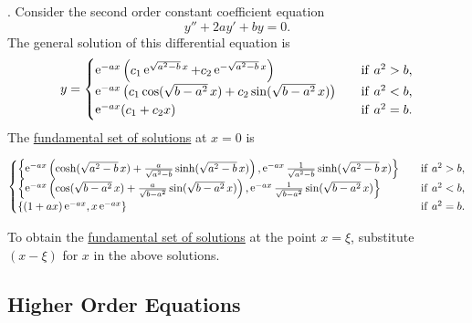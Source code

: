 \begin{Result}
  \label{const_coeff_diff_eqn}.
  Consider the second order constant coefficient equation
  \[
  y'' + 2 a y' + b y = 0.
  \]
  The general solution of this differential equation is
  \[
  y = 
  \begin{cases}
    \mathop{\mathrm{e}}\nolimits^{-a x} \left( c_1 \mathop{\mathrm{e}}\nolimits^{\sqrt{a^2-b}\,x} 
      + c_2 \mathop{\mathrm{e}}\nolimits^{-\sqrt{a^2-b}\,x} \right)
    \quad &\mathrm{if}\ a^2 > b, \\
    \mathop{\mathrm{e}}\nolimits^{-a x} \left( c_1 \cos (\sqrt{b - a^2}\,x) 
      + c_2 \sin(\sqrt{b-a^2}\,x) \right)
    \quad &\mathrm{if}\ a^2 < b, \\
    \mathop{\mathrm{e}}\nolimits^{-a x} ( c_1 + c_2 x ) 
    \quad &\mathrm{if}\ a^2 = b. 
  \end{cases}
  \]
  The 
  \hyperref[section The Fundamental Set of Solutions]
  {fundamental set of solutions}
  at $x = 0$ is
  \begin{small}
    \[
    \begin{cases}
      \left\{
        \mathop{\mathrm{e}}\nolimits^{-a x} \left( \cosh (\sqrt{a^2 - b}\, x) 
          + \frac{a}{\sqrt{a^2-b}} \sinh (\sqrt{a^2 - b}\, x) \right),
        \mathop{\mathrm{e}}\nolimits^{-a x} \frac{1}{\sqrt{a^2-b}} \sinh (\sqrt{a^2 - b}\, x)
      \right\}
      \quad &\mathrm{if}\ a^2 > b, \\
      \left\{
        \mathop{\mathrm{e}}\nolimits^{-a x} \left( \cos (\sqrt{b - a^2}\, x) 
          + \frac{a}{\sqrt{b - a^2}} \sin (\sqrt{b - a^2}\, x) \right),
        \mathop{\mathrm{e}}\nolimits^{-a x} \frac{1}{\sqrt{b - a^2}} \sin (\sqrt{b - a^2}\, x)
      \right\}
      \quad &\mathrm{if}\ a^2 < b, \\
      \left\{
        (1 + a x) \mathop{\mathrm{e}}\nolimits^{-a x},
        x \mathop{\mathrm{e}}\nolimits^{-a x} 
      \right\}
      \quad &\mathrm{if}\ a^2 = b. 
    \end{cases}
    \]
  \end{small}
  To obtain the 
  \hyperref[section The Fundamental Set of Solutions]
  {fundamental set of solutions}
  at the point $x = \xi$, substitute
  $(x - \xi)$ for $x$ in the above solutions.
\end{Result}







\subsection{Higher Order Equations}



